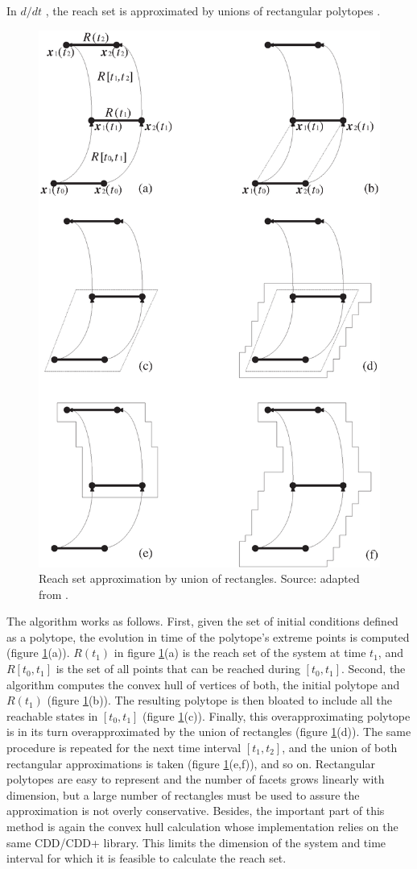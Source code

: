 In $d/dt$ \cite{DDT_HOMEPAGE},
the reach set is approximated by unions of rectangular polytopes \cite{ASARIN_BOURNEZ_DANG_MALER_APPROXIMATE_ANALYSIS_OF_PIECEWISE_LINEAR_SYSTEMS}.
\begin{figure}[htbp]
\centerline{
\includegraphics[width=6.5 cm, height=8 cm]{ddt.eps}}
\caption{Reach set approximation by union of rectangles.
Source: adapted from \cite{ASARIN_BOURNEZ_DANG_MALER_APPROXIMATE_ANALYSIS_OF_PIECEWISE_LINEAR_SYSTEMS}.}
\label{ddtfig}
\end{figure}
The algorithm works as follows. First, given the set of initial conditions
defined as a polytope, the evolution in time of the polytope's extreme points
is computed (figure \ref{ddtfig}(a)).
$R(t_1)$ in figure \ref{ddtfig}(a) is the
reach set of the system at time $t_1$, and $R[t_0, t_1]$ is the set of all
points that can be reached during $[t_0, t_1]$. Second, the
algorithm computes the convex hull of vertices of both, the initial polytope
and $R(t_1)$ (figure \ref{ddtfig}(b)).
The resulting polytope is then bloated to include
all the reachable states in $[t_0,t_1]$
(figure \ref{ddtfig}(c)). Finally, this overapproximating polytope is in its
turn overapproximated by the union of rectangles (figure \ref{ddtfig}(d)).
The same procedure is repeated for the next time interval $[t_1,t_2]$, and
the union of both rectangular approximations is taken
(figure \ref{ddtfig}(e,f)), and so on.
Rectangular polytopes are easy to represent and the number
of facets grows linearly with dimension, but a large number of rectangles
must be used to assure the approximation is not overly conservative.
Besides, the important part of this method is again the convex hull
calculation whose implementation relies on the same CDD/CDD+
library. This limits the dimension of the system and time interval
for which it is feasible to calculate the reach set.

